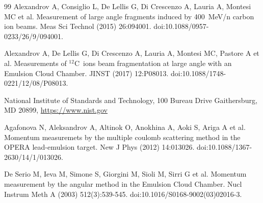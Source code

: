 \documentclass[utf8]{frontiersFPHY} %
\newcommand{\twC}{$^{\mathrm{12}}$C~}
\begin{document}
\begin{thebibliography}{99}
 Alexandrov A, Consiglio L, De Lellis G, Di Crescenzo A, Lauria A, Montesi MC et al. Measurement of large angle fragments induced by 400~MeV/n carbon ion beams. Meas Sci Technol (2015) 26:094001. doi:10.1088/0957-0233/26/9/094001.

 Alexandrov A, De Lellis G, Di Crescenzo A, Lauria A, Montesi MC, Pastore A et al. Measurements of \twC ions beam fragmentation at large angle with an Emulsion Cloud Chamber. JINST (2017) 12:P08013. doi:10.1088/1748-0221/12/08/P08013.

 National Institute of Standards and Technology, 100 Bureau Drive Gaithersburg, MD 20899, \url{https://www.nist.gov}

 Agafonova N, Aleksandrov A, Altinok O, Anokhina A, Aoki S, Ariga A et al. Momentum measuremets by the multiple coulomb scattering method in the OPERA lead-emulsion target. New J Phys (2012) 14:013026. doi:10.1088/1367-2630/14/1/013026.

 De Serio M, Ieva M, Simone S, Giorgini M, Sioli M, Sirri G et al. Momentum measurement by the angular method in the Emulsion Cloud Chamber. Nucl Instrum Meth A (2003) 512(3):539-545. doi:10.1016/S0168-9002(03)02016-3.
%
\end{thebibliography}
%
%
\end{document}
